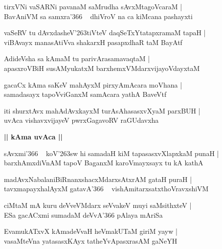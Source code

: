 \documentclass[twoside,12pt,openright]{book}
\def\S{\char'263}
\newcounter{shloka}[chapter]
\def\uvaca#1{\centerline{{\large\textbf{#1}}}}
\begin{document}
\begin{shloka}%
tirxVNi vaSARNi pavanaM saMrudha sAvxMtagoVcaraM |\\
BavAniVM sa samxra\char'366 ~ dhiVroV na ca kiMcana pashayxti 
\end{shloka}

\begin{shloka}%
vaSeRV tu dAvxdasheV\S tiVteV daqSeTxYtatapxramaM  tapaH |\\
viBAvayx manasAtiVva shakarxH pasapxdhaR taM BayAtf 
\end{shloka}

\begin{shloka}%
AdideVsha sa kAmaM tu parivArasamavaqtaM |\\
apasxroVBiH susAMyukatxM barxhemxVMdarxvijayoVdayxtaM
\end{shloka}

\begin{shloka}%
gacaCx kAma saKeV mahAyxM pirxyAmAcara moVhana |\\
samadasayx tapoVviGanxM samAcara yathA BaveVtf 
\end{shloka}

\begin{shloka}%
iti shurxtAvx mahAdAvxkayxM turAsAhasasxvXyaM parxBUH |\\
uvAca vishavxvijayeV pwrxGagavoRV raGUdavxha
\end{shloka}

\uvaca{|| kAma uvAca ||}

\begin{shloka}%
sAvxmi\char'366 ~ koV\S sw hi samadaH kiM tapasasxvXlapxkaM punaH |\\
barxhAmxdiVnAM tapoV BaganxM karoVmayxsayx tu kA kathA 
\end{shloka}

\begin{shloka}%
madAvxNabalaniBiRnanxshacxMdarxsAtxrAM gataH puraH |\\
tavxmapayxhalAyxM gatavA\char'366 ~ vishAmitarxsatxthoVravxshiVM 
\end{shloka}

\begin{shloka}%
ciMtaM mA kuru deVveVMdarx seVvakeV muyi saMsithxteV |\\
ESa gacACxmi sumadaM deVvA\char'366 pAlaya mAriSa
\end{shloka}

\begin{shloka}%
EvamukATxvX kAmadeVvaH heVmakUTaM giriM yayw |\\
vasaMteVna yatasasxKAyx tatheYvApasxrasAM gaNeYH
\end{shloka}
\end{document}
